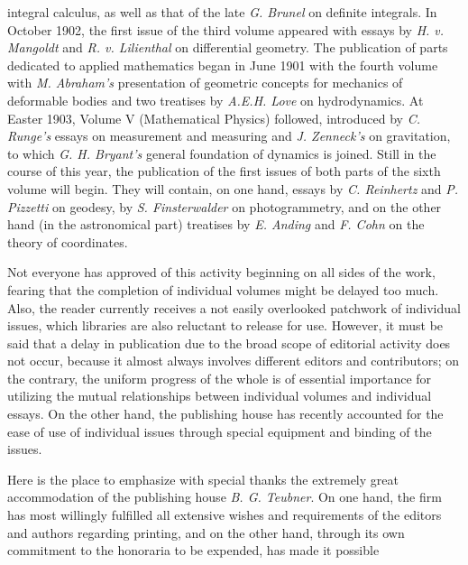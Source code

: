 \thispagestyle{fancy}

\vspace{0.5cm}

integral calculus, as well as that of the late \textit{G. Brunel} on definite integrals. In October 1902, the first issue of the third volume appeared with essays by \textit{H. v. Mangoldt} and \textit{R. v. Lilienthal} on differential geometry. The publication of parts dedicated to applied mathematics began in June 1901 with the fourth volume with \textit{M. Abraham's} presentation of geometric concepts for mechanics of deformable bodies and two treatises by \textit{A.E.H. Love} on hydrodynamics. At Easter 1903, Volume V (Mathematical Physics) followed, introduced by \textit{C. Runge's} essays on measurement and measuring and \textit{J. Zenneck's} on gravitation, to which \textit{G. H. Bryant's} general foundation of dynamics is joined. Still in the course of this year, the publication of the first issues of both parts of the sixth volume will begin. They will contain, on one hand, essays by \textit{C. Reinhertz} and \textit{P. Pizzetti} on geodesy, by \textit{S. Finsterwalder} on photogrammetry, and on the other hand (in the astronomical part) treatises by \textit{E. Anding} and \textit{F. Cohn} on the theory of coordinates.

Not everyone has approved of this activity beginning on all sides of the work, fearing that the completion of individual volumes might be delayed too much. Also, the reader currently receives a not easily overlooked patchwork of individual issues, which libraries are also reluctant to release for use. However, it must be said that a delay in publication due to the broad scope of editorial activity does not occur, because it almost always involves different editors and contributors; on the contrary, the uniform progress of the whole is of essential importance for utilizing the mutual relationships between individual volumes and individual essays. On the other hand, the publishing house has recently accounted for the ease of use of individual issues through special equipment and binding of the issues.

Here is the place to emphasize with special thanks the extremely great accommodation of the publishing house \textit{B. G. Teubner}. On one hand, the firm has most willingly fulfilled all extensive wishes and requirements of the editors and authors regarding printing, and on the other hand, through its own commitment to the honoraria to be expended, has made it possible
